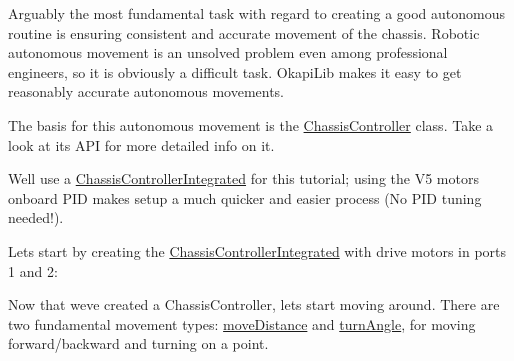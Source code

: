 Arguably the most fundamental task with regard to creating a good autonomous routine is ensuring consistent and accurate movement of the chassis. Robotic autonomous movement is an unsolved problem even among professional engineers, so it is obviously a difficult task. Okapi\+Lib makes it easy to get reasonably accurate autonomous movements.

The basis for this autonomous movement is the \mbox{\hyperlink{classokapi_1_1ChassisController}{Chassis\+Controller}} class. Take a look at its A\+PI for more detailed info on it.

We\textquotesingle{}ll use a \mbox{\hyperlink{classokapi_1_1ChassisControllerIntegrated}{Chassis\+Controller\+Integrated}} for this tutorial; using the V5 motors\textquotesingle{} onboard P\+ID makes setup a much quicker and easier process (No P\+ID tuning needed!).

Let\textquotesingle{}s start by creating the \mbox{\hyperlink{classokapi_1_1ChassisControllerIntegrated}{Chassis\+Controller\+Integrated}} with drive motors in ports 1 and 2\+:


\begin{DoxyCode}{0}
\DoxyCodeLine{}
\DoxyCodeLine{}
\end{DoxyCode}


Now that we\textquotesingle{}ve created a Chassis\+Controller, let\textquotesingle{}s start moving around. There are two fundamental movement types\+: \mbox{\hyperlink{classokapi_1_1ChassisController_a6d5b69139dfa8b814d05c74c22bcaa43}{move\+Distance}} and \mbox{\hyperlink{classokapi_1_1ChassisController_aab12308b3fad6793c007d7a33730a3f7}{turn\+Angle}}, for moving forward/backward and turning on a point.


